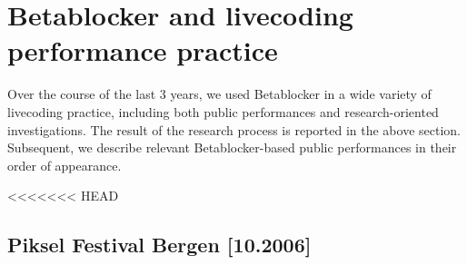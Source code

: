 \documentclass[letterpaper, 12pt]{article}
\begin{document}
% 
% 
% 
% 
% 
% 
% 
% 
% 
% 
% 
% 
% 


\parskip 18pt

\section{Betablocker and livecoding performance practice} 
\label{sec:betablocker_and_livecoding_practice_a_report}

Over the course of the last 3 years, we used Betablocker in a wide variety of livecoding practice, including both public performances and research-oriented investigations.
The result of the research process is reported in the above section.
Subsequent, we describe relevant Betablocker-based public performances in their order of appearance.

<<<<<<< HEAD
\subsection{Piksel Festival Bergen [10.2006]}
\label{sub:piksel}
\end{document}
